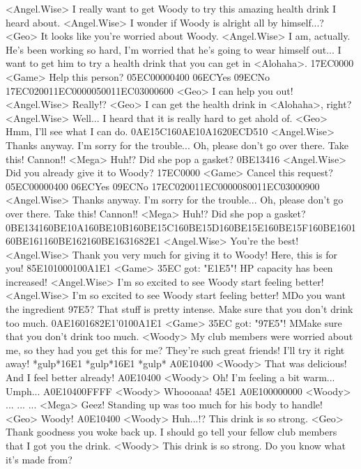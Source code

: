 <Angel.Wise> I really want to get Woody to try this amazing health drink I heard about. 
<Angel.Wise> I wonder if Woody is alright all by himself...? 
<Geo> It looks like you're worried about Woody. 
<Angel.Wise> I am, actually. 
He's been working so hard, I'm worried that he's going to wear himself out... 
I want to get him to try a health drink that you can get in <Alohaha>. 
{17}{EC}{00}{00} 
<Game> Help this person? {05}{EC}{00}{00}{04}{00}  {06}{EC}Yes   {09}{EC}No 
{17}{EC}{02}{00}{11}{EC}{00}{00}{05}{00}{11}{EC}{03}{00}{06}{00}
<Geo> I can help you out! 
<Angel.Wise> Really!? 
<Geo> I can get the health drink in <Alohaha>, right? 
<Angel.Wise> Well... I heard that it is really hard to get ahold of. 
<Geo> Hmm, I'll see what I can do. 
{0A}{E1}{5C}{16}{0A}{E1}{0A}{16}{20}{EC}{D5}{10}
<Angel.Wise> Thanks anyway. I'm sorry for the trouble... 
Oh, please don't go over there. 
Take this! Cannon!! 
<Mega> Huh!? Did she pop a gasket? 
{0B}{E1}{34}{16}
<Angel.Wise> Did you already give it to Woody? 
{17}{EC}{00}{00} 
<Game> Cancel this request? {05}{EC}{00}{00}{04}{00}  {06}{EC}Yes   {09}{EC}No 
{17}{EC}{02}{00}{11}{EC}{00}{00}{08}{00}{11}{EC}{03}{00}{09}{00}
<Angel.Wise> Thanks anyway. I'm sorry for the trouble... 
Oh, please don't go over there. 
Take this! Cannon!! 
<Mega> Huh!? Did she pop a gasket? 
{0B}{E1}{34}{16}{0B}{E1}{0A}{16}{0B}{E1}{0B}{16}{0B}{E1}{5C}{16}{0B}{E1}{5D}{16}{0B}{E1}{5E}{16}{0B}{E1}{5F}{16}{0B}{E1}{60}{16}{0B}{E1}{61}{16}{0B}{E1}{62}{16}{0B}{E1}{63}{16}{82}{E1}%
<Angel.Wise> You're the best! 
<Angel.Wise> Thank you very much for giving it to Woody! 
Here, this is for you! 
{85}{E1}{01}{00}{01}{00}{A1}{E1} 
<Game> {35}{EC} got: "{E1}{E5}"! 
HP capacity has been increased! 
<Angel.Wise> I'm so excited to see Woody start feeling better! 
<Angel.Wise> I'm so excited to see Woody start feeling better! 
MDo you want the ingredient {97}{E5}? 
That stuff is pretty intense. Make sure that you don't drink too much. 
{0A}{E1}{60}{16}{82}{E1}'{01}{00}{A1}{E1} 
<Game> {35}{EC} got: "{97}{E5}"! 
MMake sure that you don't drink too much. 
<Woody> My club members were worried about me, so they had you get this for me? 
They're such great friends! 
I'll try it right away! 
*gulp*{16}{E1} *gulp*{16}{E1} *gulp* 
{A0}{E1}{04}{00} 
<Woody> That was delicious! 
And I feel better already! 
{A0}{E1}{04}{00} 
<Woody> Oh! 
I'm feeling a bit warm... 
Umph... 
{A0}{E1}{04}{00}{FF}{FF} 
<Woody> Whoooaaa! {45}{E1} 
{A0}{E1}{00}{00}{00}{00} 
<Woody> ... 
... 
... 
<Mega> Geez! Standing up was too much for his body to handle! 
<Geo> Woody! 
{A0}{E1}{04}{00} 
<Woody> Huh...!? 
This drink is so strong. 
<Geo> Thank goodness you woke back up. 
I should go tell your fellow club members that I got you the drink. 
<Woody> This drink is so strong. 
Do you know what it's made from? 
